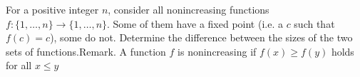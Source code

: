 For a positive integer $n$,  consider all nonincreasing functions $f : \{1,\hdots,n\}\to\{1,\hdots,n\}$. Some of them have a fixed point (i.e. a $c$ such that $f(c) = c$), some do not. Determine the difference between the sizes of the two sets of functions.Remark. A function $f$ is nonincreasing if $f(x) \geq f(y)$ holds for all $x \leq y$